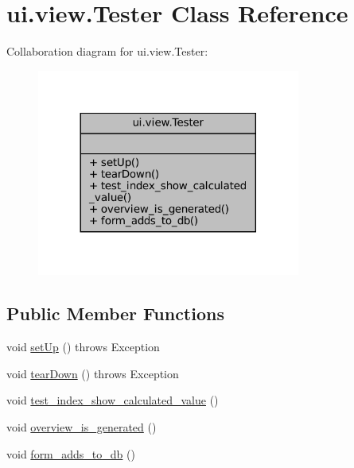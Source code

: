 \hypertarget{classui_1_1view_1_1Tester}{}\section{ui.\+view.\+Tester Class Reference}
\label{classui_1_1view_1_1Tester}


Collaboration diagram for ui.\+view.\+Tester\+:
\nopagebreak
\begin{figure}[H]
\begin{center}
\leavevmode
\includegraphics[width=245pt]{classui_1_1view_1_1Tester__coll__graph}
\end{center}
\end{figure}
\subsection*{Public Member Functions}
\begin{DoxyCompactItemize}
\item 
void \mbox{\hyperlink{classui_1_1view_1_1Tester_a96388f43fd3b670c827e9db36112d8d1}{set\+Up}} ()  throws Exception 	
\item 
void \mbox{\hyperlink{classui_1_1view_1_1Tester_a003a16bd8a57459ad09e0ec16f4cc825}{tear\+Down}} ()  throws Exception 	
\item 
void \mbox{\hyperlink{classui_1_1view_1_1Tester_a91deee94b10560269017b4ed8753df29}{test\+\_\+index\+\_\+show\+\_\+calculated\+\_\+value}} ()
\item 
void \mbox{\hyperlink{classui_1_1view_1_1Tester_add0b324fab4a0feec6790d8b9d28bbe0}{overview\+\_\+is\+\_\+generated}} ()
\item 
void \mbox{\hyperlink{classui_1_1view_1_1Tester_a0d8d87c3f0656767989f16df2f89713a}{form\+\_\+adds\+\_\+to\+\_\+db}} ()
\end{DoxyCompactItemize}


